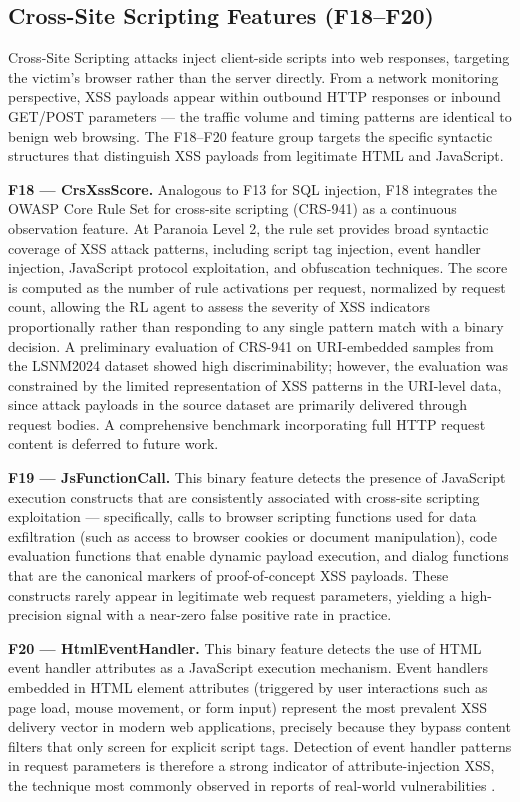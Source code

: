 \documentclass[12pt,a4paper]{report}
\begin{document}
\subsection{Cross-Site Scripting Features (F18--F20)}

Cross-Site Scripting attacks inject client-side scripts into web responses, targeting the victim's browser rather than the server directly. From a network monitoring perspective, XSS payloads appear within outbound HTTP responses or inbound GET/POST parameters --- the traffic volume and timing patterns are identical to benign web browsing. The F18--F20 feature group targets the specific syntactic structures that distinguish XSS payloads from legitimate HTML and JavaScript.

\textbf{F18 --- CrsXssScore.} Analogous to F13 for SQL injection, F18 integrates the OWASP Core Rule Set for cross-site scripting (CRS-941) \cite{owaspModSecCRS} as a continuous observation feature. At Paranoia Level 2, the rule set provides broad syntactic coverage of XSS attack patterns, including script tag injection, event handler injection, JavaScript protocol exploitation, and obfuscation techniques. The score is computed as the number of rule activations per request, normalized by request count, allowing the RL agent to assess the severity of XSS indicators proportionally rather than responding to any single pattern match with a binary decision. A preliminary evaluation of CRS-941 on URI-embedded samples from the LSNM2024 dataset showed high discriminability; however, the evaluation was constrained by the limited representation of XSS patterns in the URI-level data, since attack payloads in the source dataset are primarily delivered through request bodies. A comprehensive benchmark incorporating full HTTP request content is deferred to future work.

\textbf{F19 --- JsFunctionCall.} This binary feature detects the presence of JavaScript execution constructs that are consistently associated with cross-site scripting exploitation --- specifically, calls to browser scripting functions used for data exfiltration (such as access to browser cookies or document manipulation), code evaluation functions that enable dynamic payload execution, and dialog functions that are the canonical markers of proof-of-concept XSS payloads. These constructs rarely appear in legitimate web request parameters, yielding a high-precision signal with a near-zero false positive rate in practice.

\textbf{F20 --- HtmlEventHandler.} This binary feature detects the use of HTML event handler attributes as a JavaScript execution mechanism. Event handlers embedded in HTML element attributes (triggered by user interactions such as page load, mouse movement, or form input) represent the most prevalent XSS delivery vector in modern web applications, precisely because they bypass content filters that only screen for explicit script tags. Detection of event handler patterns in request parameters is therefore a strong indicator of attribute-injection XSS, the technique most commonly observed in reports of real-world vulnerabilities \cite{owaspModSecCRS}.
\end{document}
